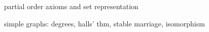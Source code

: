 \documentclass[handout]{mcs}
\begin{document}
\renewcommand{\reading}
{Chapter~\bref{dag_sec}{--\bref{prodsec}{, Partial Orders}};
Chapter~\bref{simple_graphs_chap}{--\bref{stablemarriagesec}{, Simple Graphs}}.

\noindent\textbf{Skip} Chapter~\bref{comm_net_chap}{, Communication
  Nets}, which will not be covered this term.}


\begin{editingnotes}
partial order axioms and set representation

simple graphs: degrees, halls' thm, stable marriage, isomorphism
\end{editingnotes}





\end{document}
